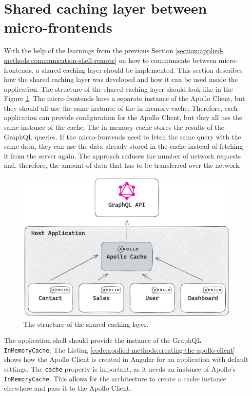 \section{Shared caching layer between micro-frontends}\label{section:applied-methods:shared-caching-layer}

\noindent With the help of the learnings from the previous Section \ref{section:applied-methods:communication-shell-remote} on how to communicate between micro-frontends, a shared caching layer should be implemented. This section describes how the shared caching layer was developed and how it can be used inside the application. The structure of the shared caching layer should look like in the Figure \ref{fig:applied-methods:structure-shared-caching-layer}. The micro-frontends have a separate instance of the Apollo Client, but they should all use the same instance of the in-memory cache. Therefore, each application can provide configuration for the Apollo Client, but they all use the same instance of the cache. The in-memory cache stores the results of the GraphQL queries. If the micro-frontends need to fetch the same query with the same data, they can use the data already stored in the cache instead of fetching it from the server again. The approach reduces the number of network requests and, therefore, the amount of data that has to be transferred over the network. 

\ifshowImages
  \begin{figure}[H]
  \centering
  \includegraphics[width=0.8\linewidth]{images/applied-methods/shared-caching-layer/shared-caching-layer.jpg}
  \caption{The structure of the shared caching layer.}\label{fig:applied-methods:structure-shared-caching-layer}
  \end{figure}
\fi

\noindent The application shell should provide the instance of the GraphQL \texttt{InMemoryCache}. The Listing \ref{code:applied-methods:creating-the-apollo-client} shows how the Apollo Client is created in Angular for an application with default settings. The \texttt{cache} property is important, as it needs an instance of Apollo's \texttt{InMemoryCache}. This allows for the architecture to create a cache instance elsewhere and pass it to the Apollo Client. 

